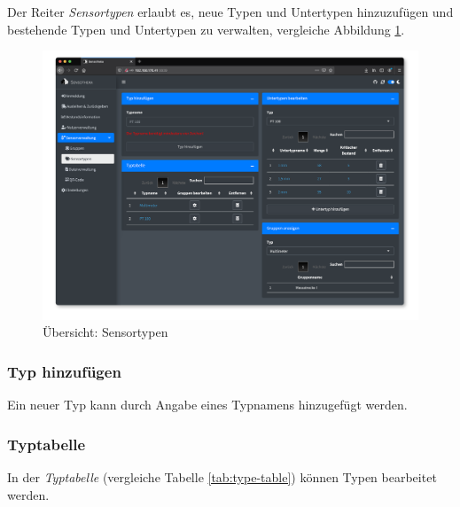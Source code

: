 \documentclass[
]{article}
\begin{document}
Der Reiter \emph{Sensortypen} erlaubt es, neue Typen und Untertypen hinzuzufügen und bestehende Typen und Untertypen zu verwalten, vergleiche Abbildung \ref{fig:type-overview}.

\begin{figure}
\centering
\includegraphics{./img/type_overview.png}
\caption{\label{fig:type-overview}Übersicht: Sensortypen}
\end{figure}

\hypertarget{typ-hinzufuxfcgen}{%
\subsubsection{Typ hinzufügen}\label{typ-hinzufuxfcgen}}

Ein neuer Typ kann durch Angabe eines Typnamens hinzugefügt werden.

\hypertarget{typtabelle}{%
\subsubsection{Typtabelle}\label{typtabelle}}

In der \emph{Typtabelle} (vergleiche Tabelle \ref{tab:type-table}) können Typen bearbeitet werden.
\end{document}
